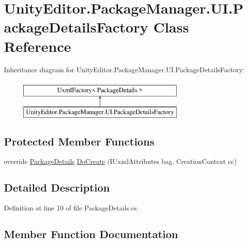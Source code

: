 \hypertarget{class_unity_editor_1_1_package_manager_1_1_u_i_1_1_package_details_factory}{}\section{Unity\+Editor.\+Package\+Manager.\+U\+I.\+Package\+Details\+Factory Class Reference}
\label{class_unity_editor_1_1_package_manager_1_1_u_i_1_1_package_details_factory}
Inheritance diagram for Unity\+Editor.\+Package\+Manager.\+U\+I.\+Package\+Details\+Factory\+:\begin{figure}[H]
\begin{center}
\leavevmode
\includegraphics[height=2.000000cm]{class_unity_editor_1_1_package_manager_1_1_u_i_1_1_package_details_factory}
\end{center}
\end{figure}
\subsection*{Protected Member Functions}
\begin{DoxyCompactItemize}
\item 
override \mbox{\hyperlink{class_unity_editor_1_1_package_manager_1_1_u_i_1_1_package_details}{Package\+Details}} \mbox{\hyperlink{class_unity_editor_1_1_package_manager_1_1_u_i_1_1_package_details_factory_aeb5c01ceebef137fb852956777b38c30}{Do\+Create}} (I\+Uxml\+Attributes bag, Creation\+Context cc)
\end{DoxyCompactItemize}


\subsection{Detailed Description}


Definition at line 10 of file Package\+Details.\+cs.



\subsection{Member Function Documentation}
\mbox{\label{class_unity_editor_1_1_package_manager_1_1_u_i_1_1_package_details_factory_aeb5c01ceebef137fb852956777b38c30}} 
